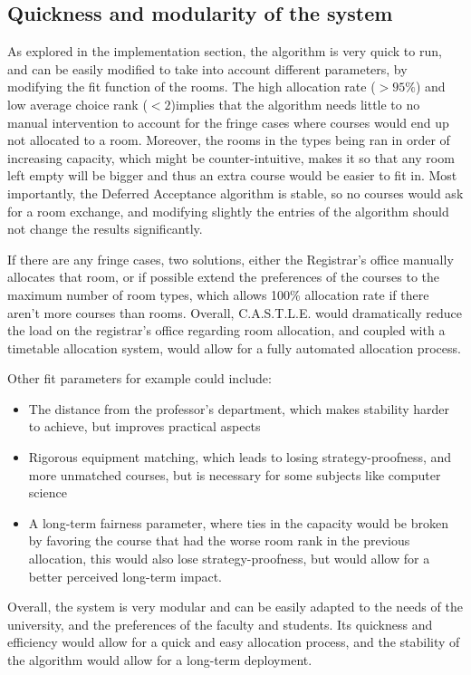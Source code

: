 \documentclass[a4paper, oneside]{article}
\theoremstyle{plain}
\newcommand{\castle}{C{\small.}A{\small.}S{\small.}T{\small.}L{\small.}E{\small.}}
\begin{document}
\subsection{Quickness and modularity of the system}

As explored in the implementation section, the algorithm is very quick to run, and can be easily modified to take into account different parameters, by modifying the fit function of the rooms.
The high allocation rate ($>95\%$) and low average choice rank ($<2$)implies that the algorithm needs little to no manual intervention to account for the fringe cases where courses would end up not allocated to a room.
Moreover, the rooms in the types being ran in order of increasing capacity, which might be counter-intuitive, makes it so that any room left empty will be bigger and thus an extra course would be easier to fit in.
Most importantly, the Deferred Acceptance algorithm is stable, so no courses would ask for a room exchange, and modifying slightly the entries of the algorithm should not change the results significantly.

If there are any fringe cases, two solutions, either the Registrar's office manually allocates that room, or if possible extend the preferences of the courses to the maximum number
of room types, which allows 100\% allocation rate if there aren't more courses than rooms. Overall, \castle{} would dramatically reduce the load on the registrar's office regarding
room allocation, and coupled with a timetable allocation system, would allow for a fully automated allocation process.

Other fit parameters for example could include:
\begin{itemize}
	\item The distance from the professor's department, which makes stability harder to achieve, but improves practical aspects
	\item Rigorous equipment matching, which leads to losing strategy-proofness, and more unmatched courses, but is necessary for some subjects like computer science
	\item A long-term fairness parameter, where ties in the capacity would be broken by favoring the course that had the worse room rank in the previous allocation,
	      this would also lose strategy-proofness, but would allow for a better perceived long-term impact.
\end{itemize}

Overall, the system is very modular and can be easily adapted to the needs of the university, and the preferences of the faculty and students. Its quickness and efficiency
would allow for a quick and easy allocation process, and the stability of the algorithm would allow for a long-term deployment.\\
\end{document}
